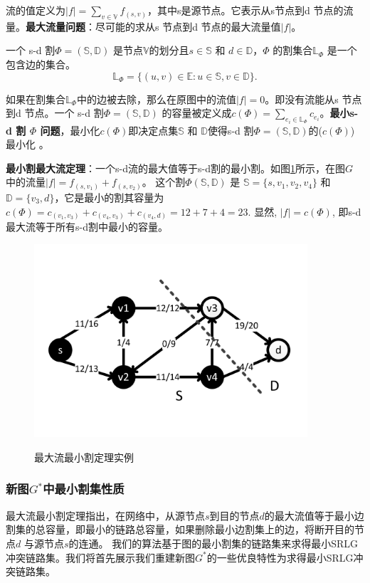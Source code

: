 流的值定义为$|f|=\sum\limits_{v\in \mathbb{V}}f_{(s,v)}$，其中s是源节点。它表示从s节点到d 节点的流量。\textbf{最大流量问题}：尽可能的求从s 节点到d 节点的最大流量值$|f|$。

一个 s-d 割${\Phi}=(\mathbb{S},\mathbb{D})$ 是节点$\mathbb{V}$的划分且$s \in \mathbb{S}$ 和 $d \in \mathbb{D}$，$\Phi$ 的割集合$\mathbb{\mathbb{L}}_{\Phi}$ 是一个包含边的集合。
\begin{equation}
\mathbb{\mathbb{L}}_{\Phi}=\{(u,v)\in \mathbb{E}: u \in \mathbb{S}, v \in \mathbb{D}\}.
\end{equation}

如果在割集合$\mathbb{\mathbb{L}}_{\Phi}$中的边被去除，那么在原图中的流值$|f| = 0$。即没有流能从s 节点到d 节点。一个 s-d 割${\Phi}=(\mathbb{S},\mathbb{D})$ 的容量被定义成$c(\Phi)=\sum\limits_{e_i\in \mathbb{\mathbb{L}}_{\Phi}}c_{e_i}$。\textbf{最小s-d 割 $\Phi$ 问题}，最小化$c(\Phi)$即决定点集$\mathbb{S}$ 和 $\mathbb{D}$使得s-d 割${\Phi}=(\mathbb{S},\mathbb{D})$的($c(\Phi)$) 最小化 。

\textbf{最小割最大流定理}：一个s-d流的最大值等于s-d割的最小割。如图\ref{fig:FlowNetwork}所示，在图$G$ 中的流量$|f|=f_{(s,v_1)}+f_{(s,v_2)}$。 这个割$\Phi(\mathbb{S},\mathbb{D})$ 是 $\mathbb{S}=\{s,v_1,v_2,v_4\}$ 和$\mathbb{D}=\{v_3,d\}$，它是最小的割其容量为$c(\Phi)=c_{(v_1,v_3)}+c_{(v_4,v_3)}+c_{(v_4,d)}=12+7+4=23$. 显然, $|f|=c(\Phi)$, 即s-d 最大流等于所有s-d割中最小的容量。
\begin{figure}[htbp]
  \centering
  \includegraphics[width=4.0in]{figures/FlowNetwork}\\
  \caption{最大流最小割定理实例}
  \label{fig:FlowNetwork}
\end{figure}

\subsubsection{新图$G^*$中最小割集性质}
最大流最小割定理指出，在网络中，从源节点$s$到目的节点$d$的最大流值等于最小边割集的总容量，即最小的链路总容量，如果删除最小边割集上的边，将断开目的节点$d$ 与源节点$s$的连通。 我们的算法基于图的最小割集的链路集来求得最小SRLG 冲突链路集。我们将首先展示我们重建新图$G^*$的一些优良特性为求得最小SRLG冲突链路集。

